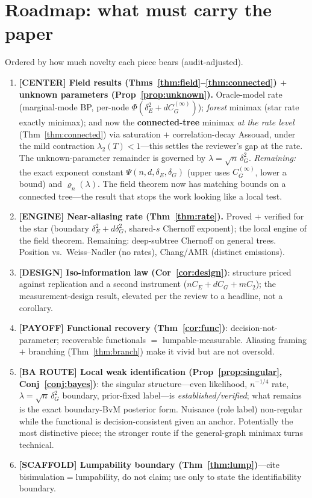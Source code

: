 \documentclass[11pt]{article}
\begin{document}
\section{Roadmap: what must carry the paper}
Ordered by how much novelty each piece bears (audit-adjusted).
\begin{enumerate}[leftmargin=*,itemsep=1pt]
  \item \textbf{[CENTER] Field results (Thms~\ref{thm:field}--\ref{thm:connected}) $+$ unknown parameters
  (Prop~\ref{prop:unknown}).} Oracle-model rate (marginal-mode BP, per-node $\Phi(\delta_E^2+d C_G^{(\infty)})$);
  \emph{forest} minimax (star rate exactly minimax); and now the \textbf{connected-tree} minimax \emph{at the
  rate level} (Thm~\ref{thm:connected}) via saturation $+$ correlation-decay Assouad, under the mild contraction
  $\lambda_2(T)<1$---this settles the reviewer's gap at the rate. The unknown-parameter remainder is governed by
  $\lambda=\sqrt n\,\delta_G^2$. \emph{Remaining:} the exact exponent constant $\Psi(n,d,\delta_E,\delta_G)$ (upper
  uses $C_G^{(\infty)}$, lower a bound) and $\varrho_n(\lambda)$. The field theorem now has matching bounds on a
  connected tree---the result that stops the work looking like a local test.
  \item \textbf{[ENGINE] Near-aliasing rate (Thm~\ref{thm:rate}).} Proved + verified for the star (boundary
  $\delta_E^2+d\delta_G^2$, shared-$s$ Chernoff exponent); the local engine of the field theorem. Remaining:
  deep-subtree Chernoff on general trees. Position vs.\ Weiss--Nadler (no rates), Chang/AMR (distinct emissions).
  \item \textbf{[DESIGN] Iso-information law (Cor~\ref{cor:design})}: structure priced against replication and a
  second instrument ($nC_E+dC_G+mC_2$); the measurement-design result, elevated per the review to a headline, not
  a corollary.
  \item \textbf{[PAYOFF] Functional recovery (Thm~\ref{cor:func})}: decision-not-parameter; recoverable
  functionals $=$ lumpable-measurable. Aliasing framing $+$ branching (Thm~\ref{thm:branch}) make it vivid but are
  not oversold.
  \item \textbf{[BA ROUTE] Local weak identification (Prop~\ref{prop:singular}, Conj~\ref{conj:bayes})}: the
  singular structure---even likelihood, $n^{-1/4}$ rate, $\lambda=\sqrt n\,\delta_G^2$ boundary, prior-fixed
  label---is \emph{established/verified}; what remains is the exact boundary-BvM posterior form. Nuisance
  (role label) non-regular while the functional is decision-consistent given an anchor. Potentially the most
  distinctive piece; the stronger route if the general-graph minimax turns technical.
  \item \textbf{[SCAFFOLD] Lumpability boundary (Thm~\ref{thm:lump})}---cite bisimulation$=$lumpability, do not
  claim; use only to state the identifiability boundary.
\end{enumerate}
\end{document}
